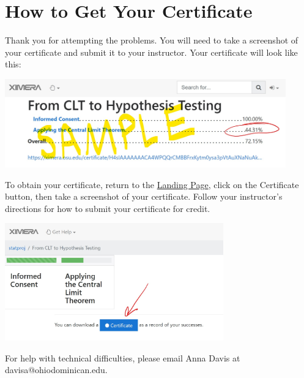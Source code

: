 \documentclass{ximera}
\begin{document}
\section{How to Get Your Certificate}
Thank you for attempting the problems.  You will need to take a screenshot of your certificate and submit it to your instructor.  Your certificate will look like this:

\begin{image}
         \includegraphics[height=1.5in]{certificate.jpg}
\end{image}

To obtain your certificate, return to the \href{https://ximera.osu.edu/statproj/CLTtoHT}{Landing Page}, click on the Certificate button, then take a screenshot of your certificate.  Follow your instructor's directions for how to submit your certificate for credit.

\begin{image}
         \includegraphics[height=2in]{certificate2.jpg}
\end{image}

For help with technical difficulties, please email Anna Davis at davisa@ohiodominican.edu.
\end{document}
